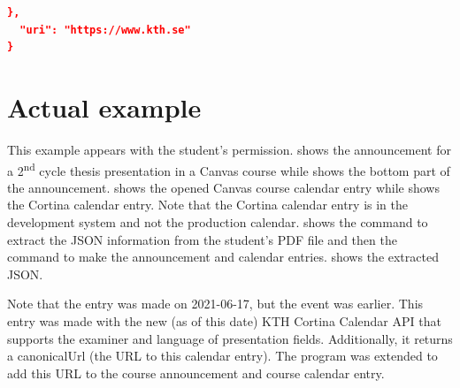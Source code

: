 \begin{lstlisting}[language={json}, caption={Response from the KTH Cortina API},label=lst:cortinaResponse]
  },
  "uri": "https://www.kth.se"
}
\end{lstlisting}


\section{Actual example}
This example appears with the student’s permission.  shows the announcement for a 2\textsuperscript{nd} cycle thesis presentation in a Canvas course while  shows the bottom part of the announcement.  shows the opened Canvas course calendar entry while  shows the Cortina calendar entry. Note that the Cortina calendar entry is in the development system and not the production calendar.  shows the command to extract the JSON information from the student’s PDF file and then the command to make the announcement and calendar entries.  shows the extracted JSON.

Note that the entry was made on 2021-06-17, but the event was earlier. This entry was made with the new (as of this date) KTH Cortina Calendar API that supports the examiner and language of presentation fields. Additionally, it returns a canonicalUrl (the URL to this calendar entry). The program was extended to add this URL to the course announcement and course calendar entry.

